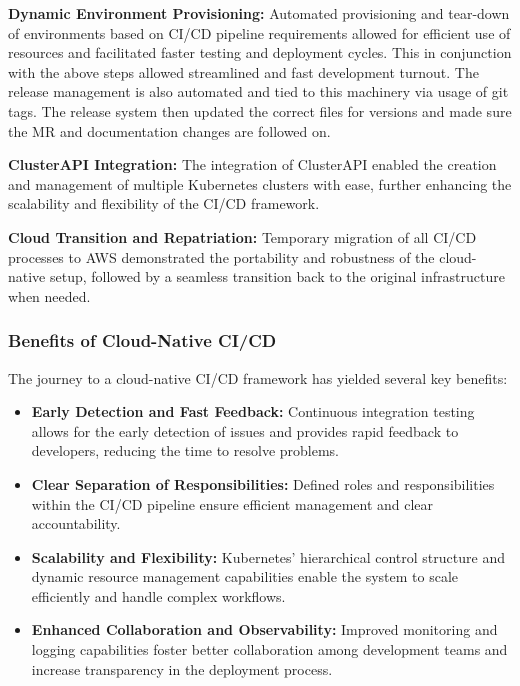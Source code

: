 \documentclass[a4paper]{spie}  %
\begin{document}
\noindent\textbf{Dynamic Environment Provisioning:} Automated provisioning and tear-down of environments based on CI/CD pipeline requirements allowed for efficient use of resources and facilitated faster testing and deployment cycles. This in conjunction with the above steps allowed streamlined and fast development turnout. The release management is also automated and tied to this machinery via usage of git tags. The release system then updated the correct files for versions and made sure the MR and documentation changes are followed on.

\noindent\textbf{ClusterAPI Integration:} The integration of ClusterAPI enabled the creation and management of multiple Kubernetes clusters with ease, further enhancing the scalability and flexibility of the CI/CD framework.

\noindent\textbf{Cloud Transition and Repatriation:} Temporary migration of all CI/CD processes to AWS demonstrated the portability and robustness of the cloud-native setup, followed by a seamless transition back to the original infrastructure when needed.

\subsubsection{Benefits of Cloud-Native CI/CD}

The journey to a cloud-native CI/CD framework has yielded several key benefits:

\begin{itemize}
    \item \textbf{Early Detection and Fast Feedback:} Continuous integration testing allows for the early detection of issues and provides rapid feedback to developers, reducing the time to resolve problems.
    \item \textbf{Clear Separation of Responsibilities:} Defined roles and responsibilities within the CI/CD pipeline ensure efficient management and clear accountability.
    \item \textbf{Scalability and Flexibility:} Kubernetes' hierarchical control structure and dynamic resource management capabilities enable the system to scale efficiently and handle complex workflows.
    \item \textbf{Enhanced Collaboration and Observability:} Improved monitoring and logging capabilities foster better collaboration among development teams and increase transparency in the deployment process.
\end{itemize}
\end{document}
